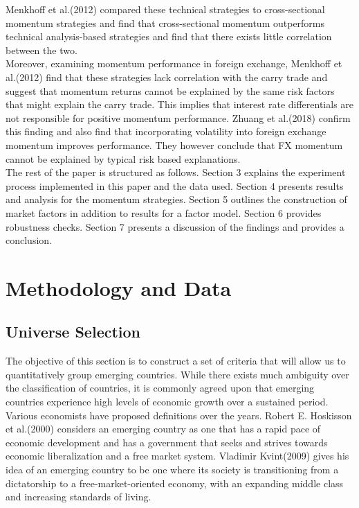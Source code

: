 \documentclass{article}
\begin{document}
Menkhoff et al.(2012) compared these technical strategies to cross-sectional momentum strategies and find that cross-sectional momentum outperforms technical analysis-based strategies and find that there exists little correlation between the two. \\

Moreover, examining momentum performance in foreign exchange, Menkhoff et al.(2012) find that these strategies lack correlation with the carry trade and suggest that momentum returns cannot be explained by the same risk factors that might explain the carry trade. This implies that interest rate differentials are not responsible for positive momentum performance. Zhuang et al.(2018) confirm this finding and also find that incorporating volatility into foreign exchange momentum improves performance. They however conclude that FX momentum cannot be explained by typical risk based explanations.\\


The rest of the paper is structured as follows. Section 3 explains the experiment process implemented in this paper and the data used. Section 4 presents results and analysis for the momentum strategies. Section 5 outlines the construction of market factors in addition to results for a factor model. Section 6 provides robustness checks. Section 7 presents a discussion of the findings and provides a conclusion.

\section{Methodology and Data}

\subsection{Universe Selection}
The objective of this section is to construct a set of criteria that will allow us to quantitatively group emerging countries. While there exists much ambiguity over the classification of countries, it is commonly agreed upon that emerging countries experience high levels of economic growth over a sustained period. Various economists have proposed definitions over the years.
Robert E. Hoskisson et al.(2000) considers an emerging country as one that has a rapid pace of economic development and has a government that seeks and strives towards economic liberalization and a free market system.
Vladimir Kvint(2009) gives his idea of an emerging country to be one where its society is transitioning from a dictatorship to a free-market-oriented economy, with an expanding middle class and increasing standards of living.\\
\end{document}
